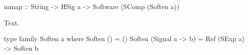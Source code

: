 \documentclass[../main.tex]{subfiles}
\begin{document}
\begin{code}
mmap :: String -> HSig a -> Software (SComp (Soften a))
\end{code}

\noindent Text.

\begin{code}
type family Soften a where
  Soften ()              = ()
  Soften (Signal a -> b) = Ref (SExp a) -> Soften b
\end{code}




\end{document}
